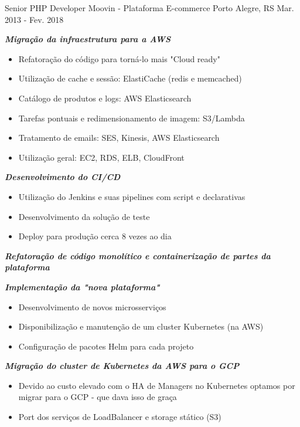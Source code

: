 \begin{cventries}
  \cventry
    {Senior PHP Developer}
    {Moovin - Plataforma E-commerce}
    {Porto Alegre, RS}
    {Mar. 2013 - Fev. 2018}
    {
      \begin{cvitems}
        \item \textit{\textbf{Migração da infraestrutura para a AWS}}
        \begin{itemize}
            \item Refatoração do código para torná-lo mais "Cloud ready"
            \item Utilização de cache e sessão: ElastiCache (redis e memcached)
            \item Catálogo de produtos e logs: AWS Elasticsearch
            \item Tarefas pontuais e redimensionamento de imagem: S3/Lambda
            \item Tratamento de emails: SES, Kinesis, AWS Elasticsearch
            \item Utilização geral: EC2, RDS, ELB, CloudFront
        \end{itemize}
        \item \textit{\textbf{Desenvolvimento do CI/CD}}
        \begin{itemize}
            \item Utilização do Jenkins e suas pipelines com script e declarativas
            \item Desenvolvimento da solução de teste
            \item Deploy para produção cerca 8 vezes ao dia
        \end{itemize}
        \item \textit{\textbf{Refatoração de código monolítico e containerização de partes da plataforma}}
        \item \textit{\textbf{Implementação da "nova plataforma"}}
        \begin{itemize}
            \item Desenvolvimento de novos microsserviços
            \item Disponibilização e manutenção de um cluster Kubernetes (na AWS)
            \item Configuração de pacotes Helm para cada projeto
        \end{itemize}
        \item \textit{\textbf{Migração do cluster de Kubernetes da AWS para o GCP}}
        \begin{itemize}
            \item Devido ao custo elevado com o HA de Managers no Kubernetes optamos por migrar para o GCP - que dava isso de graça
            \item Port dos serviços de LoadBalancer e storage stático (S3)
        \end{itemize}
      \end{cvitems}
    }

\end{cventries}
